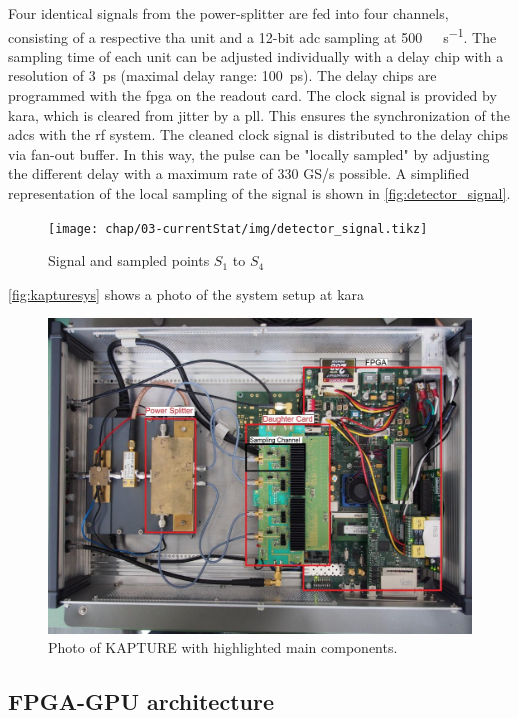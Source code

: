 Four identical signals from the power-splitter are fed into four channels, consisting of a respective \gls{tha} unit and a 12-bit \gls{adc} sampling at \SI{500}{\mega\sample\per\second}. The sampling time of each unit can be adjusted individually with a delay chip with a resolution of \SI{3}{\pico \second} (maximal delay range: \SI{100}{\pico \second}). The delay chips are programmed with the \gls{fpga} on the readout card.
The clock signal is provided by \gls{kara}, which is cleared from jitter by a \gls{pll}. This ensures the synchronization of the \glspl{adc} with the \gls{rf} system. The cleaned clock signal is distributed to the delay chips via fan-out buffer. \cite{caselleKAP}
In this way, the pulse can be "locally sampled" by adjusting the different delay with a maximum rate of 330 GS/s possible. 
A simplified representation of the local sampling of the signal is shown in \autoref{fig:detector_signal}.
\begin{figure}[tbh]
	\centering
	\texttt{[image: chap/03-currentStat/img/detector\_signal.tikz]}
	\caption{Signal and sampled points $S_1$ to $S_4$}
	\label{fig:detector_signal}
\end{figure}

\autoref{fig:kapturesys} shows a photo of the system setup at \gls{kara}
\begin{figure}[tbh]
	\centering
	\includegraphics[width = \textwidth]{chap/03-currentStat/img/kapture_sys}
	\caption{Photo of KAPTURE with highlighted main components. \cite[p.~61]{brosi}}
	\label{fig:kapturesys}
\end{figure}

\subsection{FPGA-GPU architecture}

